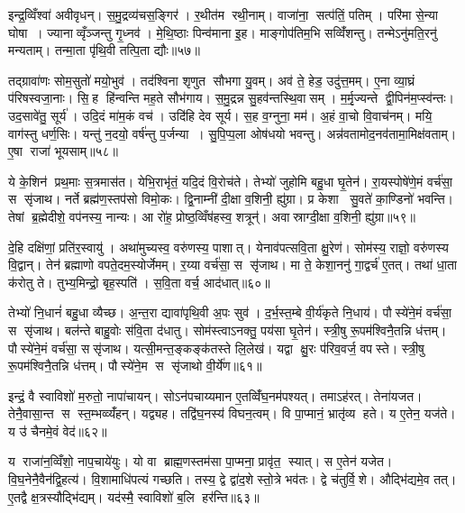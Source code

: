 इन्द्र॒व्विँश्वा॑ अवीवृधन्। स॒मु॒द्रव्य॑चस॒ङ्गिर॑। र॒थीत॑म रथी॒नाम्। वाजा॑ना॒ सत्प॑तिं॒ पतिम्। परि॑मा से॒न्या घोषा। ज्यानाव्वृँञ्जन्तु गृ॒ध्नव॑। मे॒थि॒ष्ठाः पिन्व॑माना इ॒ह। माङ्गोप॑तिम॒भि सव्विँ॑शन्तु। तन्मेऽनु॑मति॒रनु॑ मन्यताम्। तन्मा॒ता पृ॑थि॒वी तत्पि॒ता द्यौः॥५७॥

तद्ग्रावा॑णः सोम॒सुतो॑ मयो॒भुव॑। तद॑श्विना शृणुत सौभगा यु॒वम्। अव॑ ते॒ हेड॒ उदु॑त्त॒मम्। ए॒ना व्या॒घ्रं प॑रिषस्वजा॒नाः। सि॒ह हि॑न्वन्ति मह॒ते सौभ॑गाय। स॒मु॒द्रन्न सु॒हव॑न्तस्थि॒वासम्। म॒र्मृ॒ज्यन्ते द्वी॒पिन॑म॒प्स्व॑न्तः। उद॒सावे॑तु॒ सूर्य॑। उदि॒दं मा॑म॒कं वच॑। उदि॑हि देव सूर्य। स॒ह व॒ग्नुना॒ मम॑। अ॒हं वा॒चो वि॒वाच॑नम्। मयि॒ वाग॑स्तु धर्ण॒सिः। यन्तु॑ न॒दयो॒ वर्\mbox{}ष॑न्तु प॒र्जन्या। सु॒पि॒प्प॒ला ओष॑धयो भवन्तु। अन्न॑वतामोद॒नव॑तामा॒मिक्ष॑वताम्। ए॒षा राजा॑ भूयसाम्॥५८॥\anuvakamend[स्व॒धायै त्वा स॒वेन॒ द्यौः सूर्य स॒प्त च॑]

ये के॒शिन॑ प्रथ॒माः स॒त्रमास॑त। येभि॒राभृ॑तं॒ यदि॒दं वि॒रोच॑ते। तेभ्यो॑ जुहोमि बहु॒धा घृ॒तेन॑। रा॒यस्पोषे॑णे॒मं वर्च॑सा॒ स सृ॑जाथ। नर्ते ब्रह्म॑ण॒स्तप॑सो विमो॒कः। द्वि॒नाम्नी॑ दी॒क्षा व॒शिनी॒ ह्यु॑ग्रा। प्र केशा सु॒वते॑ का॒ण्डिनो॑ भवन्ति। तेषां ब्र॒ह्मेदीशे॒ वप॑नस्य॒ नान्यः। आ रो॑ह॒ प्रोष्ठ॒व्विँष॑हस्व॒ शत्रून्॑। अवास्राग्दी॒क्षा व॒शिनी॒ ह्यु॑ग्रा॥५९॥

दे॒हि दक्षि॑णां॒ प्रति॑र॒स्वायु॑। अथा॑मुच्यस्व॒ वरु॑णस्य॒ पाशात्। येनाव॑पत्सवि॒ता क्षु॒रेण॑। सोम॑स्य॒ राज्ञो॒ वरु॑णस्य वि॒द्वान्। तेन॑ ब्रह्माणो वपते॒दम॒स्योर्जेमम्। र॒य्या वर्च॑सा॒ स सृ॑जाथ। मा ते॒ केशा॒ननु॑ गा॒द्वर्च॑ ए॒तत्। तथा॑ धा॒ता क॑रोतु ते। तुभ्य॒मिन्द्रो॒ बृह॒स्पति॑। स॒वि॒ता वर्च॒ आद॑धात्॥६०॥

तेभ्यो॑ नि॒धानं॑ बहु॒धा व्यैच्छ\sn{}। अ॒न्त॒रा द्यावा॑पृथि॒वी अ॒पः सुव॑। द॒र्भ॒स्त॒म्बे वी॒र्य॑कृते नि॒धाय॑। पौस्ये॑ने॒मं वर्च॑सा॒ स सृ॑जाथ। बल॑न्ते बाहु॒वोः स॑वि॒ता द॑धातु। सोम॑स्त्वाऽनक्तु॒ पय॑सा घृ॒तेन॑। स्त्री॒षु रू॒पम॑श्विनै॒तन्नि ध॑त्तम्। पौस्ये॑ने॒मं वर्च॑सा॒ ससृ॑जाथ। यत्सी॒मन्त॒ङ्कङ्क॑तस्ते लि॒लेख॑। यद्वा क्षु॒रः प॑रिव॒वर्ज॒ वपस्ते। स्त्री॒षु रू॒पम॑श्विनै॒तन्नि ध॑त्तम्। पौस्ये॑ने॒म स सृ॑जाथो वी॒र्ये॑ण॥६१॥\anuvakamend[अवास्राग्दी॒क्षा व॒शिनी॒ ह्यु॑ग्राऽद॑धाद्व॒वर्ज॒ वप स्ते॒ द्वे च॑]

इन्द्रं॒ वै स्वाविशो॑ म॒रुतो॒ नापा॑चायन्। सोऽन॑पचाय्यमान ए॒तव्विँ॑घ॒नम॑पश्यत्। तमाऽह॑रत्। तेना॑यजत। तेनै॒वासा॒न्त स स्त॒म्भव्व्यँ॑हन्। यद्व्यह\sn{}। तद्वि॑घ॒नस्य॑ विघन॒त्वम्। वि पा॒प्मानं॒ भ्रातृ॑व्य हते। य ए॒तेन॒ यज॑ते। य उ॑ चैनमे॒वं वेद॑॥६२॥

य राजा॑न॒व्विँशो॒ नाप॒चाये॑युः। यो वा ब्राह्म॒णस्तम॑सा पा॒प्मना॒ प्रावृ॑त॒ स्यात्। स ए॒तेन॑ यजेत। वि॒घ॒नेनै॒वैन॑द्वि॒हत्य॑। वि॒शामाधि॑पत्यं गच्छति। तस्य॒ द्वे द्वा॑द॒शे स्तो॒त्रे भव॑तः। द्वे च॑तुर्वि॒शे। औद्भि॑द्यमे॒व तत्। ए॒तद्वै क्ष॒त्रस्यौद्भि॑द्यम्। यद॑स्मै॒ स्वाविशो॑ ब॒लि हर॑न्ति॥६३॥

